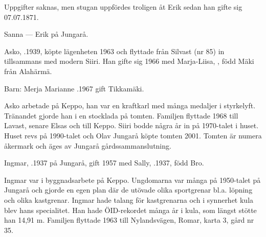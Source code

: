 Uppgifter saknas, men stugan uppfördes troligen åt Erik sedan han gifte sig 07.07.1871.

Sanna   ---  Erik  på Jungarå.



%



%
Asko, .1939, köpte lägenheten 1963 och flyttade från Silvast (nr 85) in tillsammans med modern Siiri. Han gifte sig 1966 med Marja-Liisa, , född Mäki från Alahärmä.

Barn: Merja Marianne .1967 gift Tikkamäki.

Asko arbetade på Keppo, han var en kraftkarl med många medaljer i styrkelyft. Tränandet gjorde han i en stocklada på tomten. Familjen flyttade 1968 till Lavast, senare Elsas och till Keppo. Siiri bodde några år in på 1970-talet i huset. Huset revs på 1990-talet och Olav Jungarå köpte tomten 2001. Tomten är numera åkermark och äges av Jungarå gårdssammanslutning.


%
Ingmar, .1937 på Jungarå, gift 1957 med Sally, .1937, född Bro.
\begin{jhchildren}
  \item {}
  \item {}
  \item {}
  \item {}
  \item {}
\end{jhchildren}
Ingmar var i byggnadsarbete på Keppo. Ungdomarna var många på 1950-talet på Jungarå och gjorde en egen plan där de utövade olika sportgrenar bl.a. löpning och olika kastgrenar. Ingmar hade talang för kastgrenarna och i synnerhet kula blev hans specialitet. Han hade ÖID-rekordet många år i kula, som längst stötte han 14,91 m. Familjen flyttade 1963 till Nylandsvägen, Romar, karta 3, gård nr 35.


